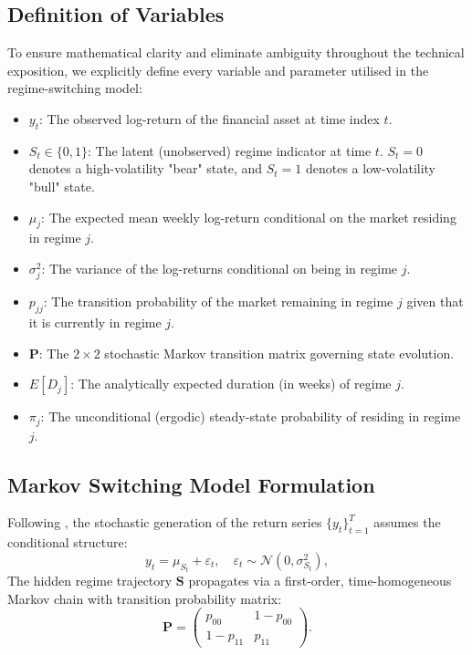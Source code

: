 \documentclass[12pt, a4paper]{article}
\begin{document}
\subsection{Definition of Variables}
To ensure mathematical clarity and eliminate ambiguity throughout the technical exposition, we explicitly define every variable and parameter utilised in the regime-switching model:
\begin{itemize}[leftmargin=*, label=$\circ$]
    \item $y_t$: The observed log-return of the financial asset at time index $t$.
    \item $S_t \in \{0, 1\}$: The latent (unobserved) regime indicator at time $t$. $S_t=0$ denotes a high-volatility "bear" state, and $S_t=1$ denotes a low-volatility "bull" state.
    \item $\mu_j$: The expected mean weekly log-return conditional on the market residing in regime $j$.
    \item $\sigma_j^2$: The variance of the log-returns conditional on being in regime $j$.
    \item $p_{jj}$: The transition probability of the market remaining in regime $j$ given that it is currently in regime $j$.
    \item $\mathbf{P}$: The $2 \times 2$ stochastic Markov transition matrix governing state evolution.
    \item $E[D_j]$: The analytically expected duration (in weeks) of regime $j$.
    \item $\pi_j$: The unconditional (ergodic) steady-state probability of residing in regime $j$.
\end{itemize}

\subsection{Markov Switching Model Formulation}
Following \citet{hamilton1989}, the stochastic generation of the return series $\{y_t\}_{t=1}^T$ assumes the conditional structure:
\begin{equation}\label{eq:msm}
  y_t = \mu_{S_t} + \varepsilon_t, \quad \varepsilon_t \sim \mathcal{N}(0, \sigma_{S_t}^2),
\end{equation}
The hidden regime trajectory $\mathbf{S}$ propagates via a first-order, time-homogeneous Markov chain with transition probability matrix:
\[
  \mathbf{P} = \begin{pmatrix} p_{00} & 1-p_{00} \\ 1-p_{11} & p_{11} \end{pmatrix}.
\]
\end{document}
